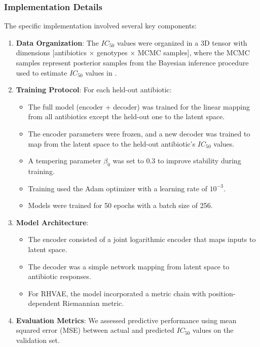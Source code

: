 \documentclass[
]{scrartcl}
\providecommand{\tightlist}{%
  \setlength{\itemsep}{0pt}\setlength{\parskip}{0pt}}\usepackage{longtable,booktabs,array}
\begin{document}
\begin{refsection}
\subsubsection{Implementation Details}\label{implementation-details}

The specific implementation involved several key components:

\begin{enumerate}
\def\labelenumi{\arabic{enumi}.}
\item
  \textbf{Data Organization}: The \(IC_{50}\) values were organized in a
  3D tensor with dimensions {[}antibiotics × genotypes × MCMC
  samples{]}, where the MCMC samples represent posterior samples from
  the Bayesian inference procedure used to estimate \(IC_{50}\) values
  in \textcite{iwasawa2022}.
\item
  \textbf{Training Protocol}: For each held-out antibiotic:

  \begin{itemize}
  \tightlist
  \item
    The full model (encoder + decoder) was trained for the linear
    mapping from all antibiotics except the held-out one to the latent
    space.
  \item
    The encoder parameters were frozen, and a new decoder was trained to
    map from the latent space to the held-out antibiotic's \(IC_{50}\)
    values.
  \item
    A tempering parameter \(\beta_0\) was set to 0.3 to improve
    stability during training.
  \item
    Training used the Adam optimizer with a learning rate of
    \(10^{-3}\).
  \item
    Models were trained for 50 epochs with a batch size of 256.
  \end{itemize}
\item
  \textbf{Model Architecture}:

  \begin{itemize}
  \tightlist
  \item
    The encoder consisted of a joint logarithmic encoder that maps
    inputs to latent space.
  \item
    The decoder was a simple network mapping from latent space to
    antibiotic responses.
  \item
    For RHVAE, the model incorporated a metric chain with
    position-dependent Riemannian metric.
  \end{itemize}
\item
  \textbf{Evaluation Metrics}: We assessed predictive performance using
  mean squared error (MSE) between actual and predicted \(IC_{50}\)
  values on the validation set.
\end{enumerate}


\end{refsection}
\end{document}
